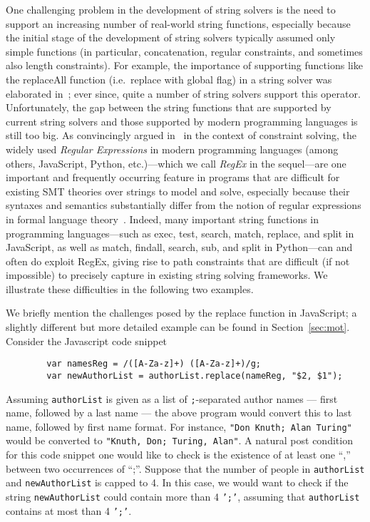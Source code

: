One challenging problem in the development of string solvers is the need
to support an increasing number of real-world string functions, especially because the
initial stage of the development of string solvers typically assumed only simple
functions (in particular, concatenation, regular constraints, and sometimes also
length constraints). For example, the importance of supporting functions like
the replaceAll function (i.e.\ replace with global flag) in a string solver was
elaborated in~\cite{CCH+18};
ever since, quite a number of string solvers support this operator.
Unfortunately, the gap between the string functions that are supported by
current string solvers and those supported by modern programming languages
is still too big. As convincingly argued in~\cite{LMK19} in the context of
constraint solving,
the widely used \emph{Regular Expressions} in modern programming
languages
(among others, JavaScript, Python, etc.)---which we call \emph{RegEx}
in the sequel---are one important and frequently occurring feature in
programs that are difficult for existing SMT theories over
strings to model and solve, especially because their syntaxes and semantics
substantially differ from the notion of regular expressions in formal
language theory~\cite{HU79}. Indeed,
many important string functions in programming languages---such as exec, test,
search, match, replace, and split in JavaScript, as well as match, findall,
search, sub, and split in Python---can and often do exploit RegEx, giving
rise to path constraints that are difficult (if not impossible) to precisely
capture in existing string solving frameworks. We illustrate these difficulties
in the following two examples.
\begin{example}\label{exmp-name-swap}
    We briefly mention the challenges posed by the replace
    function in JavaScript; a slightly different but more detailed example can be found
    in Section~\ref{sec:mot}. Consider the Javascript code snippet
    \begin{verbatim}
        var namesReg = /([A-Za-z]+) ([A-Za-z]+)/g;
        var newAuthorList = authorList.replace(nameReg, "$2, $1");
    \end{verbatim}
    Assuming \texttt{authorList} is given as a
    list of \texttt{;}-separated author names --- first name, followed by a last name ---
    the above program would convert this to last name, followed by first name
    format. For instance, \texttt{"Don Knuth; Alan Turing"} would
    be converted to \texttt{"Knuth, Don; Turing, Alan"}.
    A natural post condition for this code snippet one would like to check is the existence of at least one ``,'' between two occurrences of ``;''.
\OMIT
{
    Suppose that the number of people in \texttt{authorList} and
   \texttt{newAuthorList} is capped to 4. In this case, we would want to
   check if the string \texttt{newAuthorList} could contain
   more than 4 \texttt{';'}, assuming that \texttt{authorList} contains at most
   than 4 \texttt{';'}.
}
\end{example}


